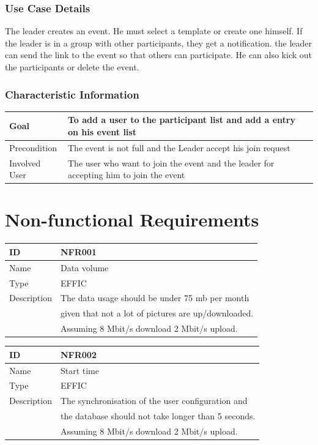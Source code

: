 \documentclass[12pt]{article}
\theoremstyle{definition}
\begin{document}
\subsubsection{Use Case Details}

The leader creates an event. He must select a template or create one himself. If the leader is in a group with other participants, they get a notification. the leader can send the link to the event so that others can participate. He can also kick out the participants or delete the event.

\subsubsection{Characteristic Information}

\begin{tabular}{|l|l|}
\hline
Goal & To add a user to the participant list and add a entry on his event list \\ \hline
Precondition &  The event is not full and the Leader accept his join request\\ \hline
Involved User &  The user who want to join the event and the leader for accepting him to join the event\\ \hline

\end{tabular}


\pagebreak

\section{Non-functional Requirements}

\begin{flushleft}
  \begin{tabular}{|l|l|}
  \hline
  ID & NFR001\\ \hline
  Name & Data volume \\ \hline
  Type &  EFFIC\\ \hline
  Description & The data usage should be under 75 mb per month \\
  & given that not a lot of pictures are up/downloaded. \\
  & Assuming 8 Mbit/s download 2 Mbit/s upload. \\ \hline
  \end{tabular}
\end{flushleft}

\vspace*{1 cm}

\begin{flushleft}
  \begin{tabular}{|l|l|}
  \hline
  ID &  NFR002\\ \hline
  Name & Start time \\ \hline
  Type &  EFFIC\\ \hline
  Description & The synchronisation of the user configuration and \\
  & the database should not take longer than 5 seconds. \\ 
  & Assuming 8 Mbit/s download 2 Mbit/s upload. \\ \hline
  \end{tabular}
\end{flushleft}
\end{document}
